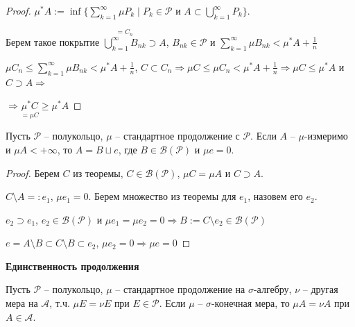 \begin{proof}
    $\mu^* A:=\inf \{\sum\limits_{k=1}^\infty \mu P_k\mid P_k\in \mathcal{P}\text{ и } A\subset \bigcup\limits_{k=1}^\infty P_k\}$.

    Берем такое покрытие $\overset{=C_n}{\bigcup\limits_{k=1}^\infty B_{nk}}\supset A$, $B_{nk}\in\mathcal{P}$ и $\sum\limits_{k=1}^\infty \mu B_{nk}<\mu^*A +\frac{1}{n}$

    $\mu C_n\leq \sum\limits_{k=1}^\infty \mu B_{nk}<\mu^*A +\frac{1}{n}$, $C\subset C_n\Rightarrow \mu C \leq \mu C_n < \mu^*A +\frac{1}{n}\Rightarrow
    \mu C \leq \mu^* A$ и $C\supset A\Rightarrow$
    
    $\Rightarrow \underset{=\mu C}{\mu^* C}\geq \mu^* A$
\end{proof}

\begin{corollary}
    Пусть $\mathcal{P}$ – полукольцо, $\mu$ – стандартное продолжение с $\mathcal{P}$. Если $A$ – 
    $\mu$-измеримо и $\mu A<+\infty$, то $A=B\sqcup e$, где $B\in \mathcal{B}(\mathcal{P})$ и $\mu e = 0$.
\end{corollary}

\begin{proof}
    Берем $C$ из теоремы, $C\in\mathcal{B}(\mathcal{P})$, $\mu C=\mu A$ и $C\supset A$.

    $C\setminus A=:e_1$, $\mu e_1 = 0$. Берем множество из теоремы для $e_1$, назовем его $e_2$.

    $e_2\supset e_1$, $e_2\in \mathcal{B}(\mathcal{P})$ и $\mu e_1=\mu e_2=0\Rightarrow B:= C\setminus e_2\in \mathcal{B}(\mathcal{P})$

    $e=A\setminus B \subset C \setminus B \subset e_2$, $\mu e_2=0\Rightarrow\mu e=0$
\end{proof}

\begin{theorem}
    \textbf{Единственность продолжения}

    Пусть $\mathcal{P}$ – полукольцо, $\mu$ – стандартное продолжение на $\sigma$-алгебру, $\nu$ – другая мера на $\mathcal{A}$,
    т.ч. $\mu E = \nu E$ при $E\in \mathcal{P}$. Если $\mu$ – $\sigma$-конечная мера, то $\mu A = \nu A$ при $A\in \mathcal{A}$.
\end{theorem}

